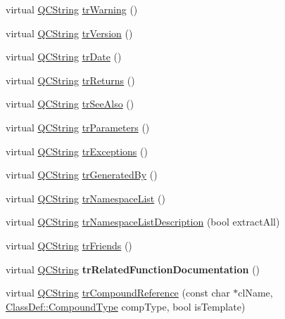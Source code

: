 \begin{DoxyCompactItemize}
virtual \mbox{\hyperlink{class_q_c_string}{Q\+C\+String}} \mbox{\hyperlink{class_translator_swedish_ab3a7c0acd97949464cc3423dce3a6d01}{tr\+Warning}} ()
\item 
virtual \mbox{\hyperlink{class_q_c_string}{Q\+C\+String}} \mbox{\hyperlink{class_translator_swedish_a104841ffa19eac540a8d0371013ebdd0}{tr\+Version}} ()
\item 
virtual \mbox{\hyperlink{class_q_c_string}{Q\+C\+String}} \mbox{\hyperlink{class_translator_swedish_ac8be7073c5ea39485a5ce7fbe2c87628}{tr\+Date}} ()
\item 
virtual \mbox{\hyperlink{class_q_c_string}{Q\+C\+String}} \mbox{\hyperlink{class_translator_swedish_aeb784d8b10a25562124603c24430c72f}{tr\+Returns}} ()
\item 
virtual \mbox{\hyperlink{class_q_c_string}{Q\+C\+String}} \mbox{\hyperlink{class_translator_swedish_a4e31e1a45f5fe7385027d3a94da013ee}{tr\+See\+Also}} ()
\item 
virtual \mbox{\hyperlink{class_q_c_string}{Q\+C\+String}} \mbox{\hyperlink{class_translator_swedish_af8c993c679bcc09b2012445ea2eca0f2}{tr\+Parameters}} ()
\item 
virtual \mbox{\hyperlink{class_q_c_string}{Q\+C\+String}} \mbox{\hyperlink{class_translator_swedish_a6808c075f8f4ffa54e97b2c2bf687eb6}{tr\+Exceptions}} ()
\item 
virtual \mbox{\hyperlink{class_q_c_string}{Q\+C\+String}} \mbox{\hyperlink{class_translator_swedish_ade916813a3c00f0b93244543c723cc34}{tr\+Generated\+By}} ()
\item 
virtual \mbox{\hyperlink{class_q_c_string}{Q\+C\+String}} \mbox{\hyperlink{class_translator_swedish_ad4375c59e7444984877149df3bd6dd05}{tr\+Namespace\+List}} ()
\item 
virtual \mbox{\hyperlink{class_q_c_string}{Q\+C\+String}} \mbox{\hyperlink{class_translator_swedish_a36328012c169e020518817fedb0bc69f}{tr\+Namespace\+List\+Description}} (bool extract\+All)
\item 
virtual \mbox{\hyperlink{class_q_c_string}{Q\+C\+String}} \mbox{\hyperlink{class_translator_swedish_ad7eccd25d860f530bf53bea81da9d4d3}{tr\+Friends}} ()
\item 
\mbox{\label{class_translator_swedish_aea34150abbfc7ddf28fe9dc750af8353}} 
virtual \mbox{\hyperlink{class_q_c_string}{Q\+C\+String}} {\bfseries tr\+Related\+Function\+Documentation} ()
\item 
virtual \mbox{\hyperlink{class_q_c_string}{Q\+C\+String}} \mbox{\hyperlink{class_translator_swedish_a5f3a8950441caf0278816697a78b4b74}{tr\+Compound\+Reference}} (const char $\ast$cl\+Name, \mbox{\hyperlink{class_class_def_ae70cf86d35fe954a94c566fbcfc87939}{Class\+Def\+::\+Compound\+Type}} comp\+Type, bool is\+Template)

\end{DoxyCompactItemize}
